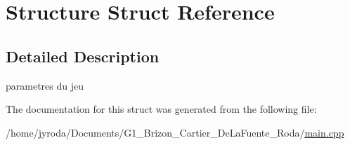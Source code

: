 \hypertarget{struct_structure}{}\section{Structure Struct Reference}
\label{struct_structure}


\subsection{Detailed Description}
parametres du jeu 

The documentation for this struct was generated from the following file\+:\begin{DoxyCompactItemize}
\item 
/home/jyroda/\+Documents/\+G1\+\_\+\+Brizon\+\_\+\+Cartier\+\_\+\+De\+La\+Fuente\+\_\+\+Roda/\hyperlink{main_8cpp}{main.\+cpp}\end{DoxyCompactItemize}
